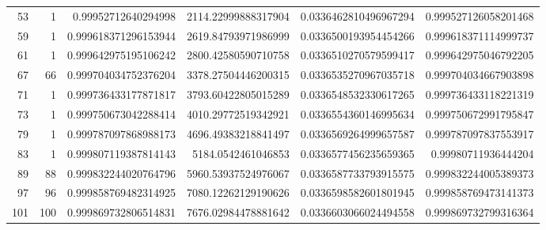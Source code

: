 \begin{table}[H]
\begin{tabular}{r r r r r r}
53 & 1 & 0.99952712640294998 & 2114.22999888317904 & 0.0336462810496967294 & 0.999527126058201468\\
59 & 1 & 0.999618371296153944 & 2619.84793971986999 & 0.0336500193954454266 & 0.999618371114999737\\
61 & 1 & 0.999642975195106242 & 2800.42580590710758 & 0.0336510270579599417 & 0.999642975046792205\\
67 & 66 & 0.999704034752376204 & 3378.27504446200315 & 0.0336535270967035718 & 0.999704034667903898\\
71 & 1 & 0.999736433177871817 & 3793.60422805015289 & 0.0336548532330617265 & 0.999736433118221319\\
73 & 1 & 0.999750673042288414 & 4010.29772519342921 & 0.0336554360146995634 & 0.999750672991795847\\
79 & 1 & 0.999787097868988173 & 4696.49383218841497 & 0.0336569264999657587 & 0.999787097837553917\\
83 & 1 & 0.999807119387814143 & 5184.0542461046853 & 0.0336577456235659365 & 0.99980711936444204\\
89 & 88 & 0.999832244020764796 & 5960.53937524976067 & 0.0336587733793915575 & 0.999832244005389373\\
97 & 96 & 0.999858769482314925 & 7080.12262129190626 & 0.0336598582601801945 & 0.999858769473141373\\
101 & 100 & 0.999869732806514831 & 7676.02984478881642 & 0.0336603066024494558 & 0.999869732799316364\\
\bottomrule
\end{tabular}
\end{table}
